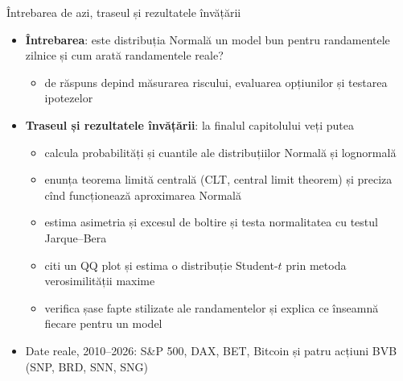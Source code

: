 \begin{frame}{Întrebarea de azi, traseul și rezultatele învățării}
\itemsize{\small}
\begin{itemize}
    \item \textbf{Întrebarea}: este distribuția Normală un model bun pentru randamentele zilnice și cum arată randamentele reale?
    \begin{itemize}
        \item de răspuns depind măsurarea riscului, evaluarea opțiunilor și testarea ipotezelor
    \end{itemize}
    \item \textbf{Traseul și rezultatele învățării}: la finalul capitolului veți putea
    \begin{itemize}
        \item calcula probabilități și cuantile ale distribuțiilor Normală și lognormală
        \item enunța teorema limită centrală (CLT, central limit theorem) și preciza cînd funcționează aproximarea Normală
        \item estima asimetria și excesul de boltire și testa normalitatea cu testul Jarque--Bera
        \item citi un QQ plot și estima o distribuție Student-$t$ prin metoda verosimilității maxime
        \item verifica șase fapte stilizate ale randamentelor  și explica ce înseamnă fiecare pentru un model
    \end{itemize}
    \item Date reale, 2010--2026: S\&P 500, DAX, BET, Bitcoin și patru acțiuni BVB (SNP, BRD, SNN, SNG)
\end{itemize}
\end{frame}

